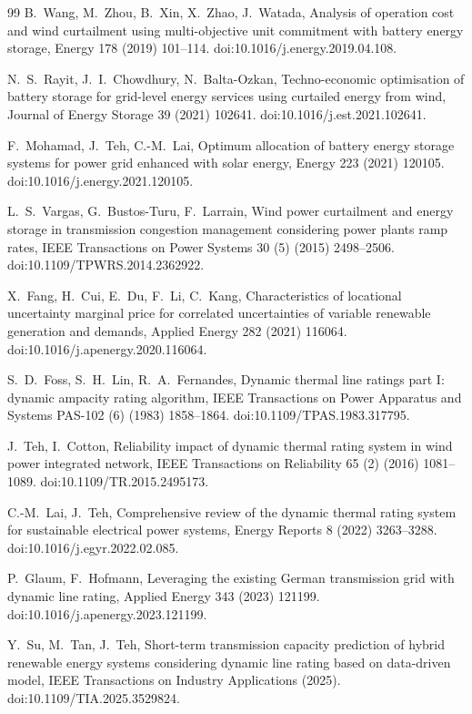 \documentclass[preprint,3p,times]{elsarticle}
\begin{document}
\begin{thebibliography}{99}
B.~Wang, M.~Zhou, B.~Xin, X.~Zhao, J.~Watada,
Analysis of operation cost and wind curtailment using multi-objective unit commitment with battery energy storage,
Energy 178 (2019) 101--114.
doi:10.1016/j.energy.2019.04.108.

N.~S.~Rayit, J.~I.~Chowdhury, N.~Balta-Ozkan,
Techno-economic optimisation of battery storage for grid-level energy services using curtailed energy from wind,
Journal of Energy Storage 39 (2021) 102641.
doi:10.1016/j.est.2021.102641.

F.~Mohamad, J.~Teh, C.-M.~Lai,
Optimum allocation of battery energy storage systems for power grid enhanced with solar energy,
Energy 223 (2021) 120105.
doi:10.1016/j.energy.2021.120105.

L.~S.~Vargas, G.~Bustos-Turu, F.~Larrain,
Wind power curtailment and energy storage in transmission congestion management considering power plants ramp rates,
IEEE Transactions on Power Systems 30 (5) (2015) 2498--2506.
doi:10.1109/TPWRS.2014.2362922.

X.~Fang, H.~Cui, E.~Du, F.~Li, C.~Kang,
Characteristics of locational uncertainty marginal price for correlated uncertainties of variable renewable generation and demands,
Applied Energy 282 (2021) 116064.
doi:10.1016/j.apenergy.2020.116064.

S.~D.~Foss, S.~H.~Lin, R.~A.~Fernandes,
Dynamic thermal line ratings part I: dynamic ampacity rating algorithm,
IEEE Transactions on Power Apparatus and Systems PAS-102 (6) (1983) 1858--1864.
doi:10.1109/TPAS.1983.317795.

J.~Teh, I.~Cotton,
Reliability impact of dynamic thermal rating system in wind power integrated network,
IEEE Transactions on Reliability 65 (2) (2016) 1081--1089.
doi:10.1109/TR.2015.2495173.

C.-M.~Lai, J.~Teh,
Comprehensive review of the dynamic thermal rating system for sustainable electrical power systems,
Energy Reports 8 (2022) 3263--3288.
doi:10.1016/j.egyr.2022.02.085.

P.~Glaum, F.~Hofmann,
Leveraging the existing German transmission grid with dynamic line rating,
Applied Energy 343 (2023) 121199.
doi:10.1016/j.apenergy.2023.121199.

Y.~Su, M.~Tan, J.~Teh,
Short-term transmission capacity prediction of hybrid renewable energy systems considering dynamic line rating based on data-driven model,
IEEE Transactions on Industry Applications (2025).
doi:10.1109/TIA.2025.3529824.


\end{thebibliography}
\end{document}
